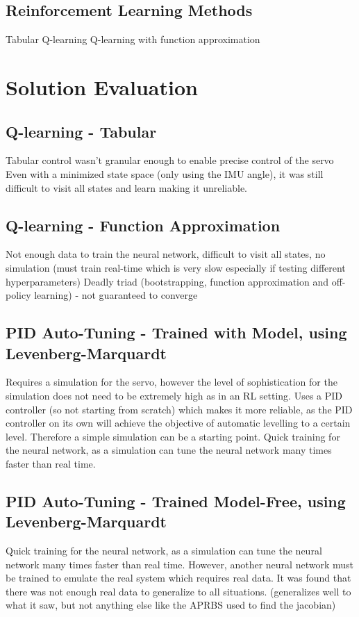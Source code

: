 \documentclass[letterpaper,12pt]{article}
\begin{document}
\subsection{Reinforcement Learning Methods}
Tabular Q-learning
Q-learning with function approximation


\section{Solution Evaluation}
\subsection{Q-learning - Tabular}
Tabular control wasn't granular enough to enable precise control of the servo
Even with a minimized state space (only using the IMU angle), it was still difficult to visit all states and learn making it unreliable.
\subsection{Q-learning - Function Approximation}
Not enough data to train the neural network, difficult to visit all states, no simulation (must train real-time which is very slow especially if testing different hyperparameters)
Deadly triad (bootstrapping, function approximation and off-policy learning) - not guaranteed to converge

\subsection{PID Auto-Tuning - Trained with Model, using Levenberg-Marquardt}
Requires a simulation for the servo, however the level of sophistication for the simulation does not need to be extremely high as in an RL setting. Uses a PID controller (so not starting from scratch) which makes it more reliable, as the PID controller on its own will achieve the objective of automatic levelling to a certain level. Therefore a simple simulation can be a starting point.
Quick training for the neural network, as a simulation can tune the neural network many times faster than real time.
\subsection{PID Auto-Tuning - Trained Model-Free, using Levenberg-Marquardt}
Quick training for the neural network, as a simulation can tune the neural network many times faster than real time. However, another neural network must be trained to emulate the real system which requires real data. It was found that there was not enough real data to generalize to all situations. (generalizes well to what it saw, but not anything else like the APRBS used to find the jacobian)
\end{document}
